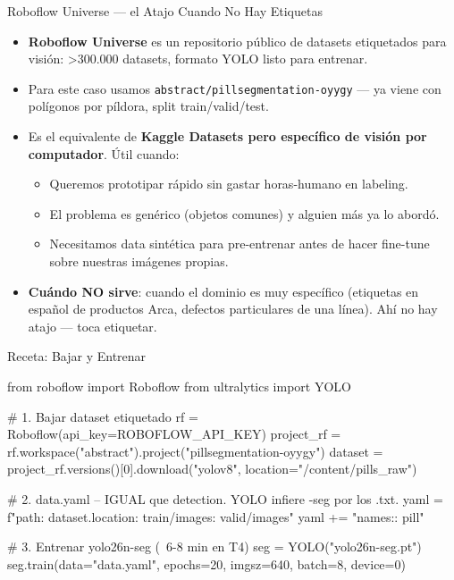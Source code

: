 \documentclass[aspectratio=169, 11pt]{beamer}
\begin{document}
\begin{frame}[shrink]{Roboflow Universe --- el Atajo Cuando No Hay Etiquetas}
  \vspace{6pt}
  \begin{itemize}\setlength\itemsep{4pt}
    \item \textbf{Roboflow Universe} es un repositorio público de datasets etiquetados para visión: \textgreater{}300.000 datasets, formato YOLO listo para entrenar.
    \item Para este caso usamos \texttt{abstract/pillsegmentation-oyygy} --- ya viene con polígonos por píldora, split train/valid/test.
    \item Es el equivalente de \textbf{Kaggle Datasets pero específico de visión por computador}. Útil cuando:
    \begin{itemize}
      \item Queremos prototipar rápido sin gastar horas-humano en labeling.
      \item El problema es genérico (objetos comunes) y alguien más ya lo abordó.
      \item Necesitamos data sintética para pre-entrenar antes de hacer fine-tune sobre nuestras imágenes propias.
    \end{itemize}
    \item \textbf{Cuándo NO sirve}: cuando el dominio es muy específico (etiquetas en español de productos Arca, defectos particulares de una línea). Ahí no hay atajo --- toca etiquetar.
  \end{itemize}
\end{frame}

\begin{frame}{Receta: Bajar y Entrenar}
  \vspace{-4pt}
  \begin{pyblock}
from roboflow import Roboflow
from ultralytics import YOLO

# 1. Bajar dataset etiquetado
rf = Roboflow(api_key=ROBOFLOW_API_KEY)
project_rf = rf.workspace("abstract").project("pillsegmentation-oyygy")
dataset = project_rf.versions()[0].download("yolov8",
                                              location="/content/pills_raw")

# 2. data.yaml -- IGUAL que detection. YOLO infiere -seg por los .txt.
yaml = f"path: {dataset.location}\ntrain: train/images\nval: valid/images\n"
yaml += "names:: pill\n"

# 3. Entrenar yolo26n-seg (~6-8 min en T4)
seg = YOLO("yolo26n-seg.pt")
seg.train(data="data.yaml", epochs=20, imgsz=640, batch=8, device=0)
  \end{pyblock}
\end{frame}
\end{document}
